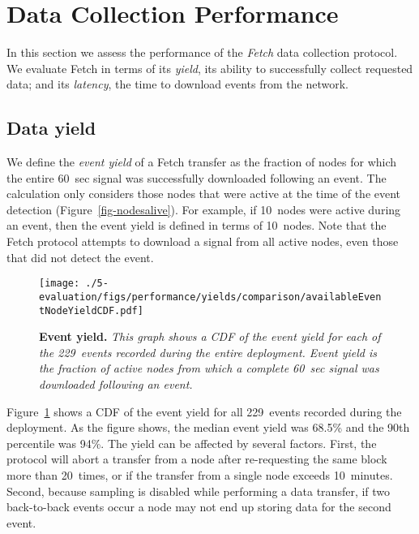 \section{Data Collection Performance}
\label{sec-performance}

In this section we assess the performance of the {\em Fetch} data collection
protocol. We evaluate Fetch in terms of its {\em yield}, its ability 
to successfully collect requested data; and its {\em latency}, the 
time to download events from the network.

\subsection{Data yield}

We define the {\em event yield} of a Fetch transfer as the fraction of
nodes for which the entire 60~sec signal was successfully downloaded
following an event. The calculation only considers those nodes that
were active at the time of the event detection (Figure~\ref{fig-nodesalive}). 
For example, if 10~nodes were active
during an event, then the event yield is defined in terms of 10~nodes.
Note that the Fetch protocol attempts to download a signal from all
active nodes, even those that did not detect the event.

\begin{figure}[t]
\begin{center}
\texttt{[image: ./5-evaluation/figs/performance/yields/comparison/availableEventNodeYieldCDF.pdf]}
\end{center}
\caption{\small{\bf Event yield.}
{\em This graph shows a CDF of the event yield for each of the 229~events
recorded during the entire deployment. Event yield is the fraction of
active nodes from which a complete 60~sec signal was downloaded
following an event.}}
\label{fig-compBlockYieldCDF}
\end{figure}

Figure~\ref{fig-compBlockYieldCDF} shows a CDF of the event 
yield for all 229~events recorded during the deployment.  As the
figure shows, the median event yield was 68.5\% and the 90th
percentile was 94\%.  The yield can be affected by several factors.
First, the protocol will abort a transfer from a node after
re-requesting the same block more than 20~times, or if the transfer
from a single node exceeds 10~minutes.  Second, because sampling is
disabled while performing a data transfer, if two back-to-back events
occur a node may not end up storing data for the second event.


